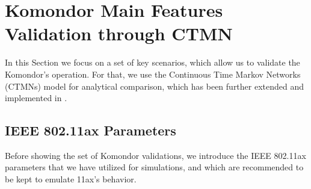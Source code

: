 \documentclass[a4paper]{article}
\begin{document}

\section{Komondor Main Features Validation through CTMN}
\label{section:validations}
	In this Section we focus on a set of key scenarios, which allow us to validate the Komondor's operation. For that, we use the Continuous Time Markov Networks (CTMNs) model \cite{bellalta2014throughput} for analytical comparison, which has been further extended and implemented in \cite{barrachina2017dynamic}. 

	\subsection{IEEE 802.11ax Parameters}
	\label{section:parameters}
	Before showing the set of Komondor validations, we introduce the IEEE 802.11ax parameters that we have utilized for simulations, and which are recommended to be kept to emulate 11ax's behavior.
	
\end{document}
